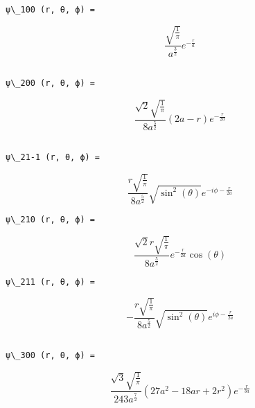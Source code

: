 \documentclass[11pt]{article}
\begin{document}
    \begin{Verbatim}[commandchars=\\\{\}]
ψ\_100 (r, θ, ϕ) =

    \end{Verbatim}

    $$\frac{\sqrt{\frac{1}{\pi}}}{a^{\frac{3}{2}}} e^{- \frac{r}{a}}$$

    
    \begin{Verbatim}[commandchars=\\\{\}]

ψ\_200 (r, θ, ϕ) =

    \end{Verbatim}

    $$\frac{\sqrt{2} \sqrt{\frac{1}{\pi}}}{8 a^{\frac{5}{2}}} \left(2 a - r\right) e^{- \frac{r}{2 a}}$$

    
    \begin{Verbatim}[commandchars=\\\{\}]

ψ\_21-1 (r, θ, ϕ) =

    \end{Verbatim}

    $$\frac{r \sqrt{\frac{1}{\pi}}}{8 a^{\frac{5}{2}}} \sqrt{\sin^{2}{\left (\theta \right )}} e^{- i \phi - \frac{r}{2 a}}$$

    
    \begin{Verbatim}[commandchars=\\\{\}]
ψ\_210 (r, θ, ϕ) =

    \end{Verbatim}

    $$\frac{\sqrt{2} r \sqrt{\frac{1}{\pi}}}{8 a^{\frac{5}{2}}} e^{- \frac{r}{2 a}} \cos{\left (\theta \right )}$$

    
    \begin{Verbatim}[commandchars=\\\{\}]
ψ\_211 (r, θ, ϕ) =

    \end{Verbatim}

    $$- \frac{r \sqrt{\frac{1}{\pi}}}{8 a^{\frac{5}{2}}} \sqrt{\sin^{2}{\left (\theta \right )}} e^{i \phi - \frac{r}{2 a}}$$

    
    \begin{Verbatim}[commandchars=\\\{\}]

ψ\_300 (r, θ, ϕ) =

    \end{Verbatim}

    $$\frac{\sqrt{3} \sqrt{\frac{1}{\pi}}}{243 a^{\frac{7}{2}}} \left(27 a^{2} - 18 a r + 2 r^{2}\right) e^{- \frac{r}{3 a}}$$
\end{document}
